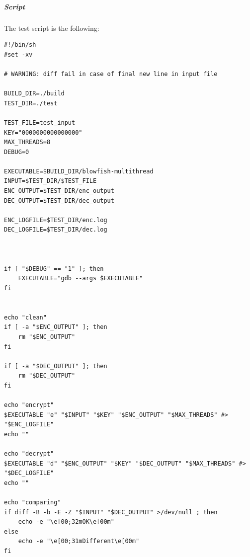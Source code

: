 \subparagraph{Script}
The test script is the following:

\begin{scripting}
\begin{verbatim}
#!/bin/sh
#set -xv

# WARNING: diff fail in case of final new line in input file

BUILD_DIR=./build
TEST_DIR=./test

TEST_FILE=test_input
KEY="0000000000000000"
MAX_THREADS=8
DEBUG=0

EXECUTABLE=$BUILD_DIR/blowfish-multithread
INPUT=$TEST_DIR/$TEST_FILE
ENC_OUTPUT=$TEST_DIR/enc_output
DEC_OUTPUT=$TEST_DIR/dec_output

ENC_LOGFILE=$TEST_DIR/enc.log
DEC_LOGFILE=$TEST_DIR/dec.log



if [ "$DEBUG" == "1" ]; then
	EXECUTABLE="gdb --args $EXECUTABLE"
fi


echo "clean"
if [ -a "$ENC_OUTPUT" ]; then
	rm "$ENC_OUTPUT"
fi

if [ -a "$DEC_OUTPUT" ]; then
	rm "$DEC_OUTPUT"
fi

echo "encrypt"
$EXECUTABLE "e" "$INPUT" "$KEY" "$ENC_OUTPUT" "$MAX_THREADS" #> "$ENC_LOGFILE"
echo ""

echo "decrypt"
$EXECUTABLE "d" "$ENC_OUTPUT" "$KEY" "$DEC_OUTPUT" "$MAX_THREADS" #> "$DEC_LOGFILE"
echo ""

echo "comparing"
if diff -B -b -E -Z "$INPUT" "$DEC_OUTPUT" >/dev/null ; then
	echo -e "\e[00;32mOK\e[00m"
else
	echo -e "\e[00;31mDifferent\e[00m"
fi
\end{verbatim}
\end{scripting}